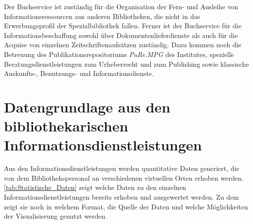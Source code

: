 Der Buchservice ist zuständig für die Organisation der Fern- und Ausleihe von Informationsressourcen 
aus anderen Bibliotheken, die nicht in das Erwerbungsprofil der Spezialbibliothek fallen. Ferner ist 
der Buchservice für die Informationsbeschaffung sowohl über Dokumentenlieferdienste als auch für die 
Acquise von einzelnen Zeitschriftenaufsätzen zuständig. Dazu kommen noch die Betreuung des Publikationsrepositoriums 
\textit{PuRe.MPG} des Institutes, spezielle Beratungsdienstleistungen zum Urheberrecht und zum Publishing 
sowie klassische Auskunfts-, Benutzungs- und Informationsdienste. 


\section{Datengrundlage aus den bibliothekarischen Informationsdienstleistungen}

Aus den Informationsdienstleistungen werden quantitative Daten generiert, die von dem Bibliothekspersonal an verschiedenen 
virtuellen Orten erhoben werden. \autoref{tab:Statistische_Daten} zeigt welche Daten zu den einzelnen 
Informationsdienstleistungen bereits erhoben und ausgewertet werden. Zu dem zeigt sie noch in welchem Format, 
die Quelle der Daten und welche Möglichkeiten der Visualisierung genutzt werden.



